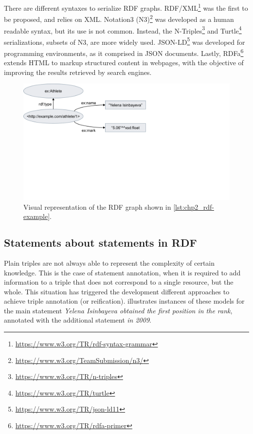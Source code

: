 There are different syntaxes to serialize RDF graphs. RDF/XML\footnote{\url{https://www.w3.org/TR/rdf-syntax-grammar}} was the first to be proposed, and relies on XML. Notation3 (N3)\footnote{\url{https://www.w3.org/TeamSubmission/n3/}} was developed as a human readable syntax, but its use is not common. Instead, the N-Triples\footnote{\url{https://www.w3.org/TR/n-triples}} and Turtle\footnote{\url{https://www.w3.org/TR/turtle}} serializations, subsets of N3, are more widely used. JSON-LD\footnote{\url{https://www.w3.org/TR/json-ld11}} was developed for programming environments, as it comprised in JSON documents. Lastly, RDFa\footnote{\url{https://www.w3.org/TR/rdfa-primer}} extends HTML to markup structured content in webpages, with the objective of improving the results retrieved by search engines. 



\begin{figure}[t]
\centering
\includegraphics[width=0.6\linewidth]{figures/chp2_rdf-example.pdf}
\caption[RDG graph example]{Visual representation of the RDF graph shown in \cref{lst:chp2_rdf-example}.}
\label{fig:chp2_rdf-example}
\end{figure}

\subsection{Statements about statements in RDF}


Plain triples are not always able to represent the complexity of certain knowledge. This is the case of statement annotation, when it is required to add information to a triple that does not correspond to a single resource, but the whole. This situation has triggered the development different approaches to achieve triple annotation (or reification).  illustrates instances of these models for the main statement \textit{Yelena Isinbayeva obtained the first position in the rank}, annotated with the additional statement \textit{in 2009}. 